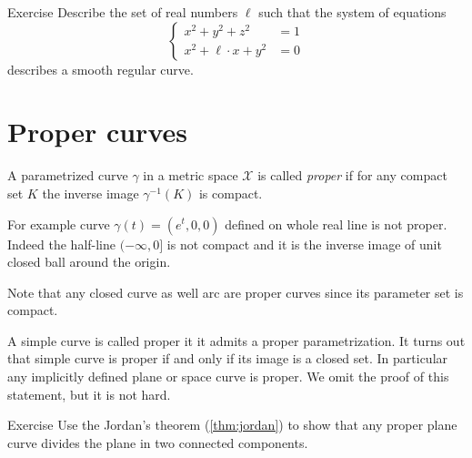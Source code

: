 \begin{thm}{Exercise}\label{ex:viviani}
Describe the set of real numbers $\ell$
such that the system of equations
\[\begin{cases}
x^2+y^2+z^2&=1
\\
x^2+\ell\cdot x+y^2&=0
\end{cases}\]
describes a smooth regular curve.
\end{thm}

\section*{Proper curves}

A parametrized curve $\gamma$ in a metric space $\mathcal{X}$ is called \emph{proper} if for any compact set $K$ the inverse image $\gamma^{-1}(K)$ is compact.

For example curve $\gamma(t)=(e^t,0,0)$ defined on whole real line is not proper.
Indeed the half-line $(-\infty,0]$ is not compact and it is the inverse image of unit closed ball around the origin.  

Note that any closed curve as well arc are proper curves since its parameter set is compact.

A simple curve is called proper it it admits a proper parametrization.
It turns out that simple curve is proper if and only if its image is a closed set.
In particular any implicitly defined plane or space curve is proper.
We omit the proof of this statement, but it is not hard. %

\begin{thm}{Exercise}\label{ex:proper-curve}
Use the Jordan's theorem (\ref{thm:jordan}) to show that any proper plane curve divides the plane in two connected components.  
\end{thm}



